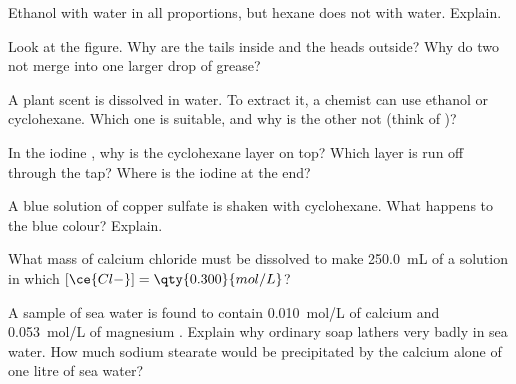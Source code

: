 \begin{exercise}[$\star\star$]\label{exo:g11:dissolution:7}
Ethanol   with water in all proportions, but hexane
 does not  with water. Explain.
\end{exercise}

\begin{exercise}[$\star\star$]\label{exo:g11:dissolution:8}
Look at the  figure. Why are the tails inside and the heads
outside? Why do two  not merge into one larger drop of grease?
\end{exercise}

\begin{exercise}[$\star\star$]\label{exo:g11:dissolution:9}
A plant scent is dissolved in water. To extract it, a chemist can use
ethanol or cyclohexane. Which one is suitable, and why is the other not
(think of )?
\end{exercise}

\begin{exercise}[$\star\star$]\label{exo:g11:dissolution:10}
In the iodine , why is the cyclohexane layer on top? Which
layer is run off through the tap? Where is the iodine at the end?
\end{exercise}

\begin{exercise}[$\star\star$]\label{exo:g11:dissolution:11}
A blue solution of copper sulfate is shaken with cyclohexane. What
happens to the blue colour? Explain.
\end{exercise}

\begin{exercise}[$\star\star\star$]\label{exo:g11:dissolution:12}
What mass of calcium chloride must be dissolved to make \qty{250.0}{mL}
of a solution in which $[\ce{Cl-}] = \qty{0.300}{mol/L}$?
\end{exercise}

\begin{exercise}[$\star\star\star$]\label{exo:g11:dissolution:13}
A sample of sea water is found to contain \qty{0.010}{mol/L} of calcium
 and \qty{0.053}{mol/L} of magnesium . Explain why ordinary soap lathers
very badly in sea water. How much sodium stearate would be precipitated
by the calcium  alone of one litre of sea water?
\end{exercise}

